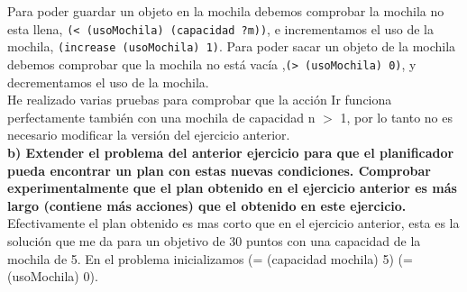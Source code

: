 \documentclass[12pt]{article}
\begin{document}
Para poder guardar un objeto en la mochila debemos comprobar la mochila no esta llena, \texttt{(< (usoMochila) (capacidad ?m))}, e incrementamos el uso de la mochila, \texttt{(increase (usoMochila) 1)}. Para poder sacar un objeto de la mochila debemos comprobar que la mochila no está vacía ,\texttt{(> (usoMochila) 0)}, y decrementamos el uso de la mochila.\\

He realizado varias pruebas para comprobar que la acción Ir funciona perfectamente también con una mochila de capacidad n $>$ 1, por lo tanto no es necesario modificar la versión del ejercicio anterior.\\

\textbf{b) Extender el problema del anterior ejercicio para que el planificador pueda
encontrar un plan con estas nuevas condiciones. Comprobar
experimentalmente que el plan obtenido en el ejercicio anterior es más largo
(contiene más acciones) que el obtenido en este ejercicio.}\\

Efectivamente el plan obtenido es mas corto que en el ejercicio anterior, esta es la solución que me da para un objetivo de 30 puntos con una capacidad de la mochila de 5. En el problema inicializamos (= (capacidad mochila) 5)
      (= (usoMochila) 0).
\end{document}
